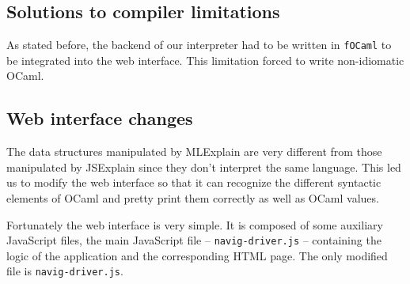 \documentclass[twocolumn]{article}
\begin{document}
\subsection{Solutions to compiler limitations}

As stated before, the backend of our interpreter had to be written in
\texttt{fOCaml} to be integrated into the web interface. This limitation forced
to write non-idiomatic OCaml.


\subsection{Web interface changes}

The data structures manipulated by MLExplain are very different from those
manipulated by JSExplain since they don't interpret the same language. This led
us to modify the web interface so that it can recognize the different syntactic
elements of OCaml and pretty print them correctly as well as OCaml values.

Fortunately the web interface is very simple. It is composed of some auxiliary
JavaScript files, the main JavaScript file -- \texttt{navig-driver.js} --
containing the logic of the application and the corresponding HTML page. The
only modified file is \texttt{navig-driver.js}.



\end{document}
